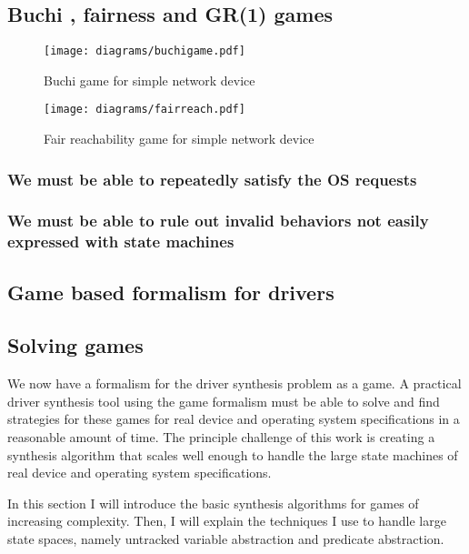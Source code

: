 \documentclass{article}
\newcommand{\buchi}{Buchi }
\begin{document}
\subsection{\buchi, fairness and GR(1) games}

\begin{figure}[t]
\centering
\texttt{[image: diagrams/buchigame.pdf]}
\caption{Buchi game for simple network device}
\label{fig:buchi}
\end{figure}

\begin{figure}[t]
\centering
\texttt{[image: diagrams/fairreach.pdf]}
\caption{Fair reachability game for simple network device}
\label{fig:fair}
\end{figure}

\subsubsection{We must be able to repeatedly satisfy the OS requests}

\subsubsection{We must be able to rule out invalid behaviors not easily expressed with state machines}

\subsection{Game based formalism for drivers}

\subsection{Solving games}

We now have a formalism for the driver synthesis problem as a game. A practical driver synthesis tool using the game formalism must be able to solve and find strategies for these games for real device and operating system specifications in a reasonable amount of time. The principle challenge of this work is creating a synthesis algorithm that scales well enough to handle the large state machines of real device and operating system specifications. 

In this section I will introduce the basic synthesis algorithms for games of increasing complexity. Then, I will explain the techniques I use to handle large state spaces, namely untracked variable abstraction and predicate abstraction.
\end{document}
